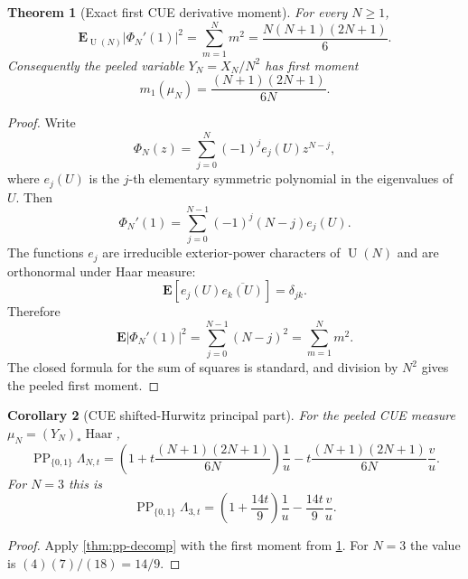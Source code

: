 \documentclass[11pt]{article}
\newcommand{\PP}{\operatorname{PP}}
\newcommand{\Haar}{\operatorname{Haar}}
\newcommand{\U}{\operatorname{U}}
\newcommand{\1}{\mathbf 1}
\newtheorem{theorem}{Theorem}[section]
\newtheorem{corollary}[theorem]{Corollary}
\numberwithin{equation}{section}
\begin{document}
\begin{theorem}[Exact first CUE derivative moment]\label{thm:first-CUE-moment}
For every $N\ge1$,
\begin{equation}
  \mathbf E_{\U(N)}|\Phi_N'(1)|^2
  =\sum_{m=1}^N m^2
  =\frac{N(N+1)(2N+1)}6.
\end{equation}
Consequently the peeled variable $Y_N=X_N/N^2$ has first moment
\begin{equation}
  m_1(\mu_N)=\frac{(N+1)(2N+1)}{6N}.
\end{equation}
\end{theorem}

\begin{proof}
Write
\begin{equation}
  \Phi_N(z)=\sum_{j=0}^N(-1)^j e_j(U)z^{N-j},
\end{equation}
where $e_j(U)$ is the $j$-th elementary symmetric polynomial in the eigenvalues of $U$.  Then
\begin{equation}
  \Phi_N'(1)=\sum_{j=0}^{N-1}(-1)^j(N-j)e_j(U).
\end{equation}
The functions $e_j$ are irreducible exterior-power characters of $\U(N)$ and are orthonormal under Haar measure:
\begin{equation}
  \mathbf E[e_j(U)\overline{e_k(U)}]=\delta_{jk}.
\end{equation}
Therefore
\begin{equation}
  \mathbf E|\Phi_N'(1)|^2=\sum_{j=0}^{N-1}(N-j)^2=\sum_{m=1}^Nm^2.
\end{equation}
The closed formula for the sum of squares is standard, and division by $N^2$ gives the peeled first moment.
\end{proof}

\begin{corollary}[CUE shifted-Hurwitz principal part]\label{cor:CUE-pp}
For the peeled CUE measure $\mu_N=(Y_N)_*\Haar$,
\begin{equation}
  \PP_{\{0,1\}}\Lambda_{N,t}
  =\left(1+t\frac{(N+1)(2N+1)}{6N}\right)\frac1u
  -t\frac{(N+1)(2N+1)}{6N}\frac vu.
\end{equation}
For $N=3$ this is
\begin{equation}
  \PP_{\{0,1\}}\Lambda_{3,t}
  =\left(1+\frac{14t}{9}\right)\frac1u-\frac{14t}{9}\frac vu.
\end{equation}
\end{corollary}

\begin{proof}
Apply \cref{thm:pp-decomp} with the first moment from \cref{thm:first-CUE-moment}.  For $N=3$ the value is $(4)(7)/(18)=14/9$.
\end{proof}
\end{document}
